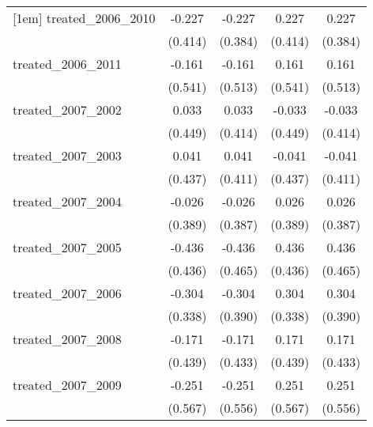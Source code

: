{\begin{tabular}{l*{4}{c}}
[1em]
treated\_2006\_2010&      -0.227         &      -0.227         &       0.227         &       0.227         \\
            &     (0.414)         &     (0.384)         &     (0.414)         &     (0.384)         \\
[1em]
treated\_2006\_2011&      -0.161         &      -0.161         &       0.161         &       0.161         \\
            &     (0.541)         &     (0.513)         &     (0.541)         &     (0.513)         \\
[1em]
treated\_2007\_2002&       0.033         &       0.033         &      -0.033         &      -0.033         \\
            &     (0.449)         &     (0.414)         &     (0.449)         &     (0.414)         \\
[1em]
treated\_2007\_2003&       0.041         &       0.041         &      -0.041         &      -0.041         \\
            &     (0.437)         &     (0.411)         &     (0.437)         &     (0.411)         \\
[1em]
treated\_2007\_2004&      -0.026         &      -0.026         &       0.026         &       0.026         \\
            &     (0.389)         &     (0.387)         &     (0.389)         &     (0.387)         \\
[1em]
treated\_2007\_2005&      -0.436         &      -0.436         &       0.436         &       0.436         \\
            &     (0.436)         &     (0.465)         &     (0.436)         &     (0.465)         \\
[1em]
treated\_2007\_2006&      -0.304         &      -0.304         &       0.304         &       0.304         \\
            &     (0.338)         &     (0.390)         &     (0.338)         &     (0.390)         \\
[1em]
treated\_2007\_2008&      -0.171         &      -0.171         &       0.171         &       0.171         \\
            &     (0.439)         &     (0.433)         &     (0.439)         &     (0.433)         \\
[1em]
treated\_2007\_2009&      -0.251         &      -0.251         &       0.251         &       0.251         \\
            &     (0.567)         &     (0.556)         &     (0.567)         &     (0.556)         \\

\end{tabular}}
